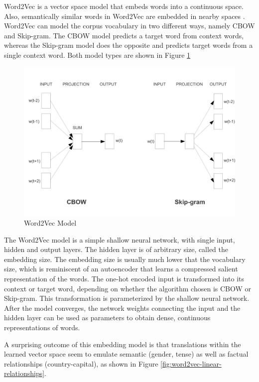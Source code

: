 Word2Vec is a vector space model that embeds words into a continuous space. Also, semantically similar words in Word2Vec are embedded in nearby spaces \citep{mikolov2013distributed,mikolov2013linguistic,le2014distributed}. Word2Vec can model the corpus vocabulary in two different ways, namely CBOW and Skip-gram. The CBOW model predicts a target word from context words, whereas the Skip-gram model does the opposite and predicts target words from a single context word. Both model types are shown in Figure \ref{fig:efficient-models}

\begin{figure}[ht]
	\centering
	\includegraphics[width=\textwidth]{images/efficient-models}
	\caption{\label{fig:efficient-models} Word2Vec Model}
\end{figure}

The Word2Vec model is a simple shallow neural network, with single input, hidden and output layers. The hidden layer is of arbitrary size, called the embedding size. The embedding size is usually much lower that the vocabulary size, which is reminiscent of an autoencoder that learns a compressed salient representation of the words. The one-hot encoded input is transformed into its context or target word, depending on whether the algorithm chosen is CBOW or Skip-gram. This transformation is parameterized by the shallow neural network. After the model converges, the network weights connecting the input and the hidden layer can be used as parameters to obtain dense, continuous representations of words.

A surprising outcome of this embedding model is that translations within the learned vector space seem to emulate semantic (gender, tense) as well as factual relationships (country-capital), as shown in Figure \ref{fig:word2vec-linear-relationships}.

